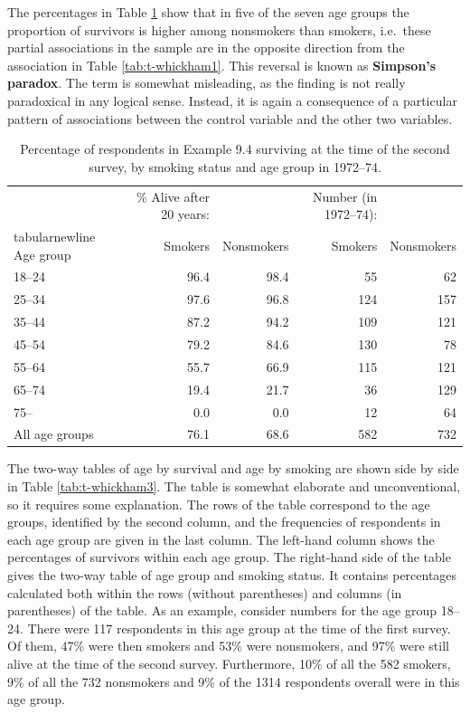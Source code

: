 \documentclass[11pt,a4paper,openany]{book}
\begin{document}
The percentages in Table \ref{tab:t-whickham2} show that in five of the
seven age groups the proportion of survivors is higher among nonsmokers
than smokers, i.e.~these partial associations in the sample are in the
opposite direction from the association in Table \ref{tab:t-whickham1}.
This reversal is known as \textbf{Simpson's paradox}. The term is
somewhat misleading, as the finding is not really paradoxical in any
logical sense. Instead, it is again a consequence of a particular
pattern of associations between the control variable and the other two
variables.

\begin{longtable}[]{@{}lrrrr@{}}
\caption{\label{tab:t-whickham2} Percentage of respondents in Example 9.4
surviving at the time of the second survey, by smoking status and age
group in 1972--74.}\tabularnewline
\toprule
\ & \% Alive after 20 years: & \ & Number (in 1972--74): &
\\tabularnewline
Age group & Smokers & Nonsmokers & Smokers & Nonsmokers\tabularnewline
18--24 & 96.4 & 98.4 & 55 & 62\tabularnewline
25--34 & 97.6 & 96.8 & 124 & 157\tabularnewline
35--44 & 87.2 & 94.2 & 109 & 121\tabularnewline
45--54 & 79.2 & 84.6 & 130 & 78\tabularnewline
55--64 & 55.7 & 66.9 & 115 & 121\tabularnewline
65--74 & 19.4 & 21.7 & 36 & 129\tabularnewline
75-- & 0.0 & 0.0 & 12 & 64\tabularnewline
All age groups & 76.1 & 68.6 & 582 & 732\tabularnewline
\bottomrule
\end{longtable}

The two-way tables of age by survival and age by smoking are shown side
by side in Table \ref{tab:t-whickham3}. The table is somewhat elaborate
and unconventional, so it requires some explanation. The rows of the
table correspond to the age groups, identified by the second column, and
the frequencies of respondents in each age group are given in the last
column. The left-hand column shows the percentages of survivors within
each age group. The right-hand side of the table gives the two-way table
of age group and smoking status. It contains percentages calculated both
within the rows (without parentheses) and columns (in parentheses) of
the table. As an example, consider numbers for the age group 18--24.
There were 117 respondents in this age group at the time of the first
survey. Of them, 47\% were then smokers and 53\% were nonsmokers, and
97\% were still alive at the time of the second survey. Furthermore,
10\% of all the 582 smokers, 9\% of all the 732 nonsmokers and 9\% of
the 1314 respondents overall were in this age group.
\end{document}
